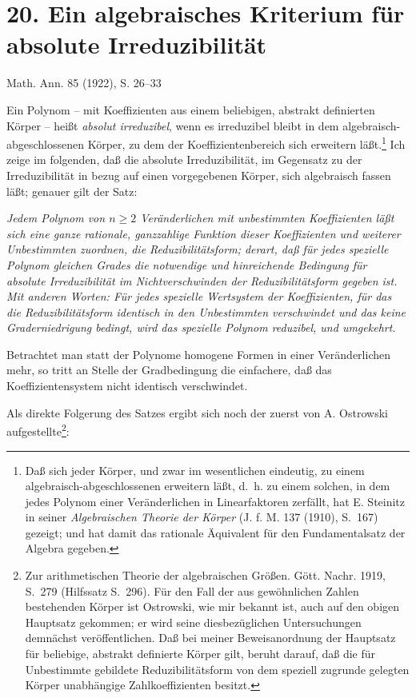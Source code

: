 ﻿\setcounter{footnote}{0}
\section*{20. Ein algebraisches Kriterium für absolute Irreduzibilität}
\begin{center}
Math. Ann. 85 (1922), S. 26--33
\end{center}

Ein Polynom -- mit Koeffizienten aus einem beliebigen, abstrakt definierten Körper -- heißt \emph{absolut irreduzibel}, wenn es irreduzibel bleibt in dem algebraisch-abgeschlossenen Körper, zu dem der Koeffizientenbereich sich erweitern läßt.\footnote{Daß sich jeder Körper, und zwar im wesentlichen eindeutig, zu einem algebraisch-abgeschlossenen erweitern läßt, d.~h. zu einem solchen, in dem jedes Polynom einer Veränderlichen in Linearfaktoren zerfällt, hat E. Steinitz in seiner \emph{Algebraischen Theorie der Körper} (J. f. M. 137 (1910), S.~167) gezeigt; und hat damit das rationale Äquivalent für den Fundamentalsatz der Algebra gegeben.} Ich zeige im folgenden, daß die absolute Irreduzibilität, im Gegensatz zu der Irreduzibilität in bezug auf einen vorgegebenen Körper, sich algebraisch fassen läßt; genauer gilt der Satz:

\emph{Jedem Polynom von $n\ge2$ Veränderlichen mit unbestimmten Koeffizienten läßt sich eine ganze rationale, ganzzahlige Funktion dieser Koeffizienten und weiterer Unbestimmten zuordnen, die Reduzibilitätsform; derart, daß für jedes spezielle Polynom gleichen Grades die notwendige und hinreichende Bedingung für absolute Irreduzibilität im Nichtverschwinden der Reduzibilitätsform gegeben ist. Mit anderen Worten: Für jedes spezielle Wertsystem der Koeffizienten, für das die Reduzibilitätsform identisch in den Unbestimmten verschwindet und das keine Graderniedrigung bedingt, wird das spezielle Polynom reduzibel, und umgekehrt.}

Betrachtet man statt der Polynome homogene Formen in einer Veränderlichen mehr, so tritt an Stelle der Gradbedingung die einfachere, daß das Koeffizientensystem nicht identisch verschwindet.

Als direkte Folgerung des Satzes ergibt sich noch der zuerst von A. Ostrowski aufgestellte\footnote{Zur arithmetischen Theorie der algebraischen Größen. Gött. Nachr. 1919, S.~279 (Hilfssatz S.~296). Für den Fall der aus gewöhnlichen Zahlen bestehenden Körper ist Ostrowski, wie mir bekannt ist, auch auf den obigen Hauptsatz gekommen; er wird seine diesbezüglichen Untersuchungen demnächst veröffentlichen. Daß bei meiner Beweisanordnung der Hauptsatz für beliebige, abstrakt definierte Körper gilt, beruht darauf, daß die für Unbestimmte gebildete Reduzibilitätsform von dem speziell zugrunde gelegten Körper unabhängige Zahlkoeffizienten besitzt.}:

